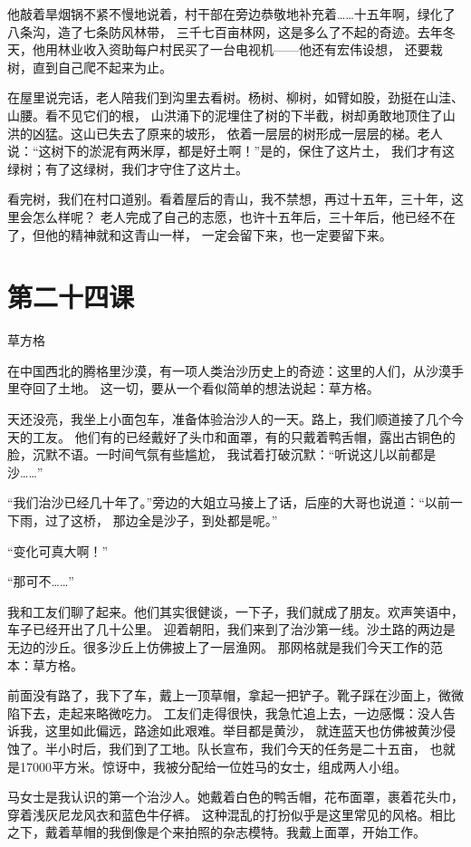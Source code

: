 \documentclass[12pt,UTF8]{ctexbook}
\begin{document}
他敲着旱烟锅不紧不慢地说着，村干部在旁边恭敬地补充着……十五年啊，绿化了八条沟，造了七条防风林带，
三千七百亩林网，这是多么了不起的奇迹。去年冬天，他用林业收入资助每户村民买了一台电视机——他还有宏伟设想，
还要栽树，直到自己爬不起来为止。

在屋里说完话，老人陪我们到沟里去看树。杨树、柳树，如臂如股，劲挺在山洼、山腰。看不见它们的根，
山洪涌下的泥埋住了树的下半截，树却勇敢地顶住了山洪的凶猛。这山已失去了原来的坡形，
依着一层层的树形成一层层的梯。老人说：“这树下的淤泥有两米厚，都是好土啊！”是的，保住了这片土，
我们才有这绿树；有了这绿树，我们才守住了这片土。

看完树，我们在村口道别。看着屋后的青山，我不禁想，再过十五年，三十年，这里会怎么样呢？
老人完成了自己的志愿，也许十五年后，三十年后，他已经不在了，但他的精神就和这青山一样，
一定会留下来，也一定要留下来。

\section{第二十四课}

草方格

在中国西北的腾格里沙漠，有一项人类治沙历史上的奇迹：这里的人们，从沙漠手里夺回了土地。
这一切，要从一个看似简单的想法说起：草方格。

天还没亮，我坐上小面包车，准备体验治沙人的一天。路上，我们顺道接了几个今天的工友。
他们有的已经戴好了头巾和面罩，有的只戴着鸭舌帽，露出古铜色的脸，沉默不语。一时间气氛有些尴尬，
我试着打破沉默：“听说这儿以前都是沙……”

“我们治沙已经几十年了。”旁边的大姐立马接上了话，后座的大哥也说道：“以前一下雨，过了这桥，
那边全是沙子，到处都是呢。”

“变化可真大啊！”

“那可不……”

我和工友们聊了起来。他们其实很健谈，一下子，我们就成了朋友。欢声笑语中，车子已经开出了几十公里。
迎着朝阳，我们来到了治沙第一线。沙土路的两边是无边的沙丘。很多沙丘上仿佛披上了一层渔网。
那网格就是我们今天工作的范本：草方格。

前面没有路了，我下了车，戴上一顶草帽，拿起一把铲子。靴子踩在沙面上，微微陷下去，走起来略微吃力。
工友们走得很快，我急忙追上去，一边感慨：没人告诉我，这里如此偏远，路途如此艰难。举目都是黄沙，
就连蓝天也仿佛被黄沙侵蚀了。半小时后，我们到了工地。队长宣布，我们今天的任务是二十五亩，
也就是17000平方米。惊讶中，我被分配给一位姓马的女士，组成两人小组。

马女士是我认识的第一个治沙人。她戴着白色的鸭舌帽，花布面罩，裹着花头巾，穿着浅灰尼龙风衣和蓝色牛仔裤。
这种混乱的打扮似乎是这里常见的风格。相比之下，戴着草帽的我倒像是个来拍照的杂志模特。我戴上面罩，开始工作。
\end{document}
